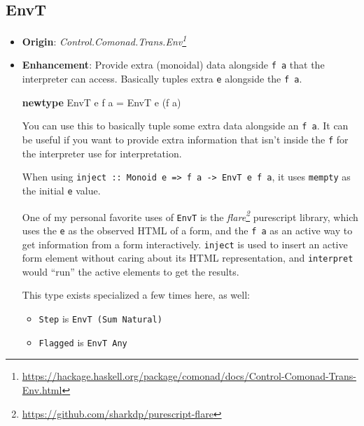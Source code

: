 \documentclass[]{article}
\newenvironment{Shaded}{}{}
\newcommand{\DataTypeTok}[1]{\textcolor[rgb]{0.56,0.13,0.00}{#1}}
\newcommand{\KeywordTok}[1]{\textcolor[rgb]{0.00,0.44,0.13}{\textbf{#1}}}
\newcommand{\NormalTok}[1]{#1}
\newcommand{\OtherTok}[1]{\textcolor[rgb]{0.00,0.44,0.13}{#1}}
\renewcommand{\href}[2]{#2\footnote{\url{#1}}}
\begin{document}
\subsection{EnvT}\label{envt}

\begin{itemize}
\item
  \textbf{Origin}:
  \emph{\href{https://hackage.haskell.org/package/comonad/docs/Control-Comonad-Trans-Env.html}{Control.Comonad.Trans.Env}}
\item
  \textbf{Enhancement}: Provide extra (monoidal) data alongside \texttt{f\ a}
  that the interpreter can access. Basically tuples extra \texttt{e} alongside
  the \texttt{f\ a}.

\begin{Shaded}
\begin{Highlighting}[]
\KeywordTok{newtype} \DataTypeTok{EnvT}\NormalTok{ e f a }\OtherTok{=} \DataTypeTok{EnvT}\NormalTok{ e (f a)}
\end{Highlighting}
\end{Shaded}

  You can use this to basically tuple some extra data alongside an
  \texttt{f\ a}. It can be useful if you want to provide extra information that
  isn't inside the \texttt{f} for the interpreter use for interpretation.

  When using
  \texttt{inject\ ::\ Monoid\ e\ =\textgreater{}\ f\ a\ -\textgreater{}\ EnvT\ e\ f\ a},
  it uses \texttt{mempty} as the initial \texttt{e} value.

  One of my personal favorite uses of \texttt{EnvT} is the
  \emph{\href{https://github.com/sharkdp/purescript-flare}{flare}} purescript
  library, which uses the \texttt{e} as the observed HTML of a form, and the
  \texttt{f\ a} as an active way to get information from a form interactively.
  \texttt{inject} is used to insert an active form element without caring about
  its HTML representation, and \texttt{interpret} would ``run'' the active
  elements to get the results.

  This type exists specialized a few times here, as well:

  \begin{itemize}
  \tightlist
  \item
    \texttt{Step} is \texttt{EnvT\ (Sum\ Natural)}
  \item
    \texttt{Flagged} is \texttt{EnvT\ Any}
  \end{itemize}
\end{itemize}
\end{document}
